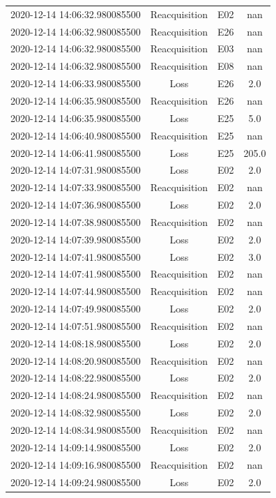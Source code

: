\begin{enumerate}
\begin{longtabu}{cccc}
2020{-}12{-}14 14:06:32.980085500&Reacquisition&E02&nan\\%
2020{-}12{-}14 14:06:32.980085500&Reacquisition&E26&nan\\%
2020{-}12{-}14 14:06:32.980085500&Reacquisition&E03&nan\\%
2020{-}12{-}14 14:06:32.980085500&Reacquisition&E08&nan\\%
2020{-}12{-}14 14:06:33.980085500&Loss&E26&2.0\\%
2020{-}12{-}14 14:06:35.980085500&Reacquisition&E26&nan\\%
2020{-}12{-}14 14:06:35.980085500&Loss&E25&5.0\\%
2020{-}12{-}14 14:06:40.980085500&Reacquisition&E25&nan\\%
2020{-}12{-}14 14:06:41.980085500&Loss&E25&205.0\\%
2020{-}12{-}14 14:07:31.980085500&Loss&E02&2.0\\%
2020{-}12{-}14 14:07:33.980085500&Reacquisition&E02&nan\\%
2020{-}12{-}14 14:07:36.980085500&Loss&E02&2.0\\%
2020{-}12{-}14 14:07:38.980085500&Reacquisition&E02&nan\\%
2020{-}12{-}14 14:07:39.980085500&Loss&E02&2.0\\%
2020{-}12{-}14 14:07:41.980085500&Loss&E02&3.0\\%
2020{-}12{-}14 14:07:41.980085500&Reacquisition&E02&nan\\%
2020{-}12{-}14 14:07:44.980085500&Reacquisition&E02&nan\\%
2020{-}12{-}14 14:07:49.980085500&Loss&E02&2.0\\%
2020{-}12{-}14 14:07:51.980085500&Reacquisition&E02&nan\\%
2020{-}12{-}14 14:08:18.980085500&Loss&E02&2.0\\%
2020{-}12{-}14 14:08:20.980085500&Reacquisition&E02&nan\\%
2020{-}12{-}14 14:08:22.980085500&Loss&E02&2.0\\%
2020{-}12{-}14 14:08:24.980085500&Reacquisition&E02&nan\\%
2020{-}12{-}14 14:08:32.980085500&Loss&E02&2.0\\%
2020{-}12{-}14 14:08:34.980085500&Reacquisition&E02&nan\\%
2020{-}12{-}14 14:09:14.980085500&Loss&E02&2.0\\%
2020{-}12{-}14 14:09:16.980085500&Reacquisition&E02&nan\\%
2020{-}12{-}14 14:09:24.980085500&Loss&E02&2.0\\%

\end{longtabu}
\end{enumerate}
